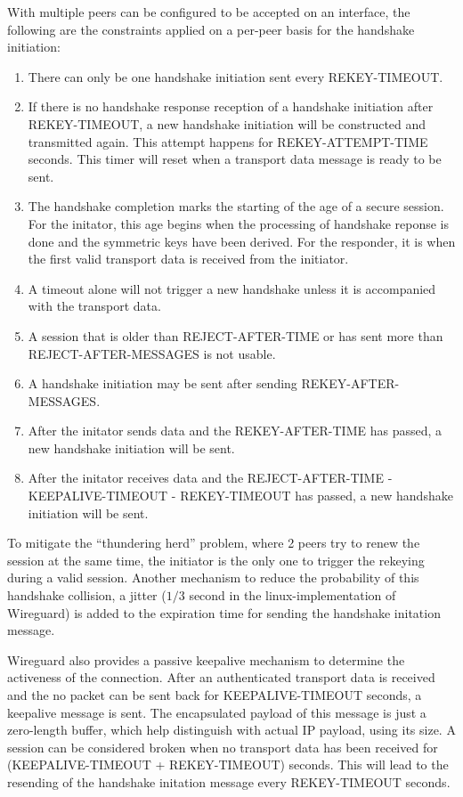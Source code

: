   With multiple peers can be configured to be accepted on an interface, the following are the constraints
  applied on a per-peer basis for the handshake initiation:
  \begin{enumerate}
    \item There can only be one handshake initiation sent every \uppercase{REKEY-TIMEOUT}.
    \item If there is no handshake response reception of a handshake initiation after \uppercase{rekey-timeout},
    a new handshake initiation will be constructed and transmitted again. This attempt happens
    for \uppercase{REKEY-attempt-time} seconds. This timer will reset when a transport data
    message is ready to be sent.
    \item The handshake completion marks the starting of the age of a secure session. For the initator,
    this age begins when the processing of handshake reponse is done and the symmetric keys have
    been derived. For the responder, it is when the first valid transport data is received from
    the initiator.
    \item A timeout alone will not trigger a new handshake unless it is accompanied with the transport data.
    \item A session that is older than \uppercase{reject-after-time} or has sent more than \uppercase{REJECT-AFTER-MESSAGES}
    is not usable.
    \item A handshake initiation may be sent after sending \uppercase{Rekey-after-messages}.
    \item After the initator sends data and the \uppercase{Rekey-after-time} has passed, 
    a new handshake initiation will be sent.
    \item After the initator receives data and the \uppercase{Reject-after-time} - \uppercase{keepalive-timeout} 
    - \uppercase{rekey-timeout} has passed, a new handshake initiation will be sent.
  \end{enumerate}
    To mitigate the ``thundering herd'' problem, where 2 peers try to renew the session at the same time, 
    the initiator is the only one to trigger the rekeying during a valid session. Another mechanism to
    reduce the probability of this handshake collision, a jitter ($1/3$ second in the linux-implementation of Wireguard) 
    is added to the expiration time for sending the handshake initation message.

    Wireguard also provides a passive keepalive mechanism to determine the activeness of the connection.
    After an authenticated transport data is received and the no packet can be sent back for \uppercase{keepalive-timeout} seconds,
    a keepalive message is sent. The encapsulated payload of this message is just a zero-length buffer,
    which help distinguish with actual IP payload, using its size. A session can be considered broken
    when no transport data has been received for (\uppercase{keepalive-timeout} + \uppercase{rekey-timeout}) seconds.
    This will lead to the resending of the handshake initation message every \uppercase{REKEY-TIMEOUT} seconds.

